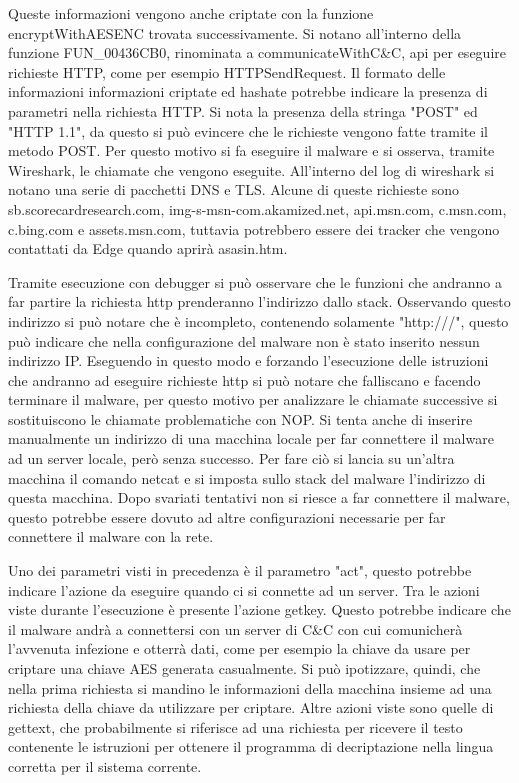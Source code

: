 \documentclass[a4paper,12pt]{article}
\begin{document}
Queste informazioni vengono anche criptate con la funzione encryptWithAESENC trovata successivamente.
Si notano all'interno della funzione FUN\_00436CB0, rinominata a communicateWithC\&C, api per eseguire richieste HTTP, come per esempio HTTPSendRequest. Il formato delle informazioni informazioni criptate ed hashate potrebbe indicare la presenza di parametri nella richiesta HTTP. Si nota la presenza della stringa "POST" ed "HTTP 1.1", da questo si può evincere che le richieste vengono fatte tramite il metodo POST.
Per questo motivo si fa eseguire il malware e si osserva, tramite Wireshark, le chiamate che vengono eseguite. All'interno del log di wireshark si notano una serie di pacchetti DNS e TLS.  Alcune di queste richieste sono sb.scorecardresearch.com, img-s-msn-com.akamized.net, api.msn.com, c.msn.com, c.bing.com e assets.msn.com, tuttavia potrebbero essere dei tracker che vengono contattati da Edge quando aprirà asasin.htm. 

Tramite esecuzione con debugger si può osservare  che le funzioni che andranno a far partire la richiesta http prenderanno l'indirizzo dallo stack. Osservando questo indirizzo si può notare che è incompleto, contenendo solamente "http:///", questo può indicare che nella configurazione del malware non è stato inserito nessun indirizzo IP. Eseguendo in questo modo e forzando l'esecuzione delle istruzioni che andranno ad eseguire richieste http si può notare che falliscano e facendo terminare il malware, per questo motivo per analizzare le chiamate successive si sostituiscono le chiamate problematiche con NOP. 
Si tenta anche di inserire manualmente un indirizzo di una macchina locale per far connettere il malware ad un server locale, però senza successo. Per fare ciò si lancia su un'altra macchina il comando netcat e si imposta sullo stack del malware l'indirizzo di questa macchina. Dopo svariati tentativi non si riesce a far connettere il malware, questo potrebbe essere dovuto ad altre configurazioni necessarie per far connettere il malware con la rete. 

Uno dei parametri visti in precedenza è il parametro "act", questo potrebbe indicare l'azione da eseguire quando ci si connette ad un server. Tra le azioni viste durante l'esecuzione è presente l'azione getkey. Questo potrebbe indicare che il malware andrà a connettersi con un server di C\&C con cui comunicherà l'avvenuta infezione e otterrà dati, come per esempio la chiave da usare per criptare una chiave AES generata casualmente. Si può ipotizzare, quindi, che nella prima richiesta si mandino le informazioni della macchina insieme ad una richiesta della chiave da utilizzare per criptare.
Altre azioni viste sono quelle di gettext, che probabilmente si riferisce ad una richiesta per ricevere il testo contenente le istruzioni per ottenere il programma di decriptazione nella lingua corretta per il sistema corrente. 
\end{document}
